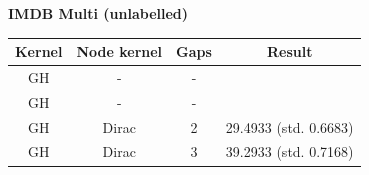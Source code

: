\documentclass{article}
\begin{document}
\textbf{IMDB Multi (unlabelled)}\\
\begin{minipage}{0.6\linewidth}
	\hspace*{-1in}

	\label{fig:imdb_unlabelled}
\end{minipage}
\begin{minipage}[c]{0.5\linewidth}	
	\centering
	\begin{tabular}{c|c|c|c}
		Kernel & Node kernel & Gaps & Result\\
		\hline
		GH & - & - & \\
		GH & - & - & \\
		GH & Dirac & 2 & 29.4933 (std. 0.6683) \\
		GH & Dirac & 3 & 39.2933 (std. 0.7168) \\
	\end{tabular}
	\label{table:imdb_multi_unlabelled}
\end{minipage}
\end{document}
